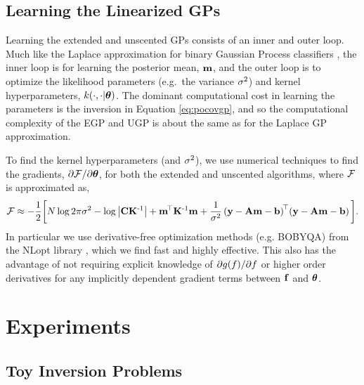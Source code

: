 \documentclass{article} %
\begin{document}
\subsection{Learning the Linearized GPs}

Learning the extended and unscented GPs consists of  an inner and outer loop.
Much like the Laplace approximation for binary Gaussian Process classifiers
\cite{Rasmussen2006}, the inner loop is for learning the posterior mean,
$\mathbf{m}$, and the outer loop is to optimize the likelihood parameters
(e.g.~the variance $\sigma^2$) and kernel hyperparameters,
$k\!\left({{\cdot}, {\cdot|\boldsymbol\theta}}\right)$. The dominant computational cost in learning
the parameters is the inversion in Equation \eqref{eq:pocovgp}, and so the
computational complexity of the EGP and UGP is about the same as for the
Laplace GP approximation.

To find the kernel hyperparameters (and $\sigma^2$), we use numerical techniques
to find the gradients, $\partial\mathcal{F}/\partial\boldsymbol\theta$, for both the extended
and unscented algorithms, where $\mathcal{F}$ is approximated as,
\begin{equation}
    \mathcal{F} \approx - \frac{1}{2} \bigg[
    N\log{2\pi\ensuremath{\sigma^2}} - \log\left|{\mathbf{C}\mathbf{K}^{\text{-}1}}\right|
    + \mathbf{m}^{\!\top}\mathbf{K}^{\text{-}1} \mathbf{m}
    + \frac{1}{\sigma^2}
        \left({\mathbf{y} - \mathbf{A}\mathbf{m} - \mathbf{b}}\right)^{\!\top}\!
        \left({\mathbf{y} - \mathbf{A}\mathbf{m} - \mathbf{b}}\right)
    \bigg].
    \label{eq:fengygp}
\end{equation}
In particular we use derivative-free optimization methods (e.g. BOBYQA)
from the NLopt library \cite{JohnsonNLOPT}, which we find fast and highly
effective. This also has the advantage of not requiring explicit knowledge of
$\partial g\!\left({{f}}\right)\!/\partial f$ or higher order derivatives for
any implicitly dependent gradient terms between $\mathbf{f}$ and $\boldsymbol\theta$. 


\section{Experiments}
\label{sec:experiments}



\subsection{Toy Inversion Problems}
\label{sec:exptoy}
\end{document}
